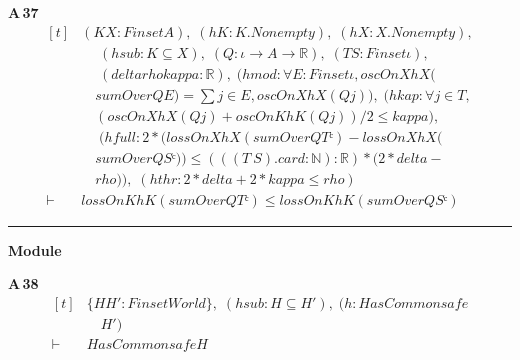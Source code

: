 \noindent\textbf{A\,37}\quad{}
{\footnotesize\[ \begin{aligned}[t]
&(\mathit{K} \mathit{X} : \mathit{Finset} \mathit{A}),\; (\mathit{hK} : \mathit{K}.\mathit{Nonempty}),\; (\mathit{hX} : \mathit{X}.\mathit{Nonempty}),\\
&\quad \; (\mathit{hsub} : \mathit{K} \subseteq \mathit{X}),\; (\mathit{Q} : \iota \to \mathit{A} \to \mathbb{R} ),\; (\mathit{T} \mathit{S} : \mathit{Finset} \iota ),\\
&\quad \; (\mathit{delta} \mathit{rho} \mathit{kappa} : \mathbb{R} ),\; (\mathit{hmod} : \forall \mathit{E} : \mathit{Finset} \iota , \mathit{oscOn} \mathit{X} \mathit{hX} (\\
&\quad \mathit{sumOver} \mathit{Q} \mathit{E}) = \textstyle\sum \mathit{j} \in \mathit{E}, \mathit{oscOn} \mathit{X} \mathit{hX} (\mathit{Q} \mathit{j})),\; (\mathit{hkap} : \forall \mathit{j} \in \mathit{T},\\
&\quad (\mathit{oscOn} \mathit{X} \mathit{hX} (\mathit{Q} \mathit{j}) + \mathit{oscOn} \mathit{K} \mathit{hK} (\mathit{Q} \mathit{j})) / 2 \leq \mathit{kappa}),\\
&\quad \; (\mathit{hfull} : 2 * (\mathit{lossOn} \mathit{X} \mathit{hX} (\mathit{sumOver} \mathit{Q} \mathit{Tᶜ}) - \mathit{lossOn} \mathit{X} \mathit{hX} (\\
&\quad \mathit{sumOver} \mathit{Q} \mathit{Sᶜ})) \leq (((\mathit{T} \ \mathit{S}).\mathit{card} : \mathbb{N} ) : \mathbb{R} ) * (2 * \mathit{delta} -\\
&\quad \mathit{rho})),\; (\mathit{hthr} : 2 * \mathit{delta} + 2 * \mathit{kappa} \leq \mathit{rho})\\
\vdash\;&\mathit{lossOn} \mathit{K} \mathit{hK} (\mathit{sumOver} \mathit{Q} \mathit{Tᶜ}) \leq \mathit{lossOn} \mathit{K} \mathit{hK} (\mathit{sumOver} \mathit{Q} \mathit{Sᶜ})
\end{aligned} \]}

\vspace{4pt}\noindent\rule{\columnwidth}{0.4pt}\par\vspace{2pt}
\noindent\textbf{Module }\par\vspace{3pt}

\noindent\textbf{A\,38}\quad{}
{\footnotesize\[ \begin{aligned}[t]
&\{ \mathit{H} \mathit{H'} : \mathit{Finset} \mathit{World}\},\; (\mathit{hsub} : \mathit{H} \subseteq \mathit{H'}),\; (\mathit{h} : \mathit{HasCommon} \mathit{safe}\\
&\quad \mathit{H'})\\
\vdash\;&\mathit{HasCommon} \mathit{safe} \mathit{H}
\end{aligned} \]}

